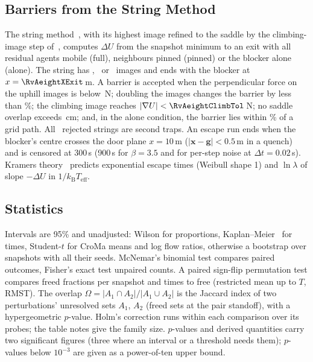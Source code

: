 \subsection{Barriers from the String Method}\label{sec:barrier}
The string method~\cite{e2007}, with its highest image refined to the saddle by the climbing-image step of~\cite{henkelman2000}, computes $\Delta U$ from the snapshot minimum to an exit with all residual agents mobile (full), neighbours pinned (pinned) or the blocker alone (alone). The string has \RvAeightImgLo, \RvAeightImgMid\ or \RvAeightImgHi\ images and ends with the blocker at $x=\RvAeightXExit$\,m. A barrier is accepted when the perpendicular force on the uphill images is below \RvAeightFTol\,N; doubling the images changes the barrier by less than \RvAeightDoubleTol\%; the climbing image reaches $|\nabla U|<\RvAeightClimbTol$\,N; no saddle overlap exceeds \RvAeightOverlap\,cm; and, in the alone condition, the barrier lies within \RvAeightGridTol\% of a grid path. All \RvAeightFailed\ rejected strings are second traps. An escape run ends when the blocker's centre crosses the door plane $x=10$\,m ($|\mathbf{x}-\mathbf{g}|<0.5$\,m in a quench) and is censored at 300\,s (900\,s for $\beta=3.5$ and for per-step noise at $\Delta t=0.02$\,s). Kramers theory~\cite{kramers1940,langer1969,hanggi1990} predicts exponential escape times (Weibull shape 1) and $\ln\lambda$ of slope $-\Delta U$ in $1/k_{\mathrm{B}}T_{\mathrm{eff}}$.

\subsection{Statistics}\label{sec:stats}
Intervals are 95\% and unadjusted: Wilson for proportions, Kaplan--Meier~\cite{kaplanmeier1958} for times, Student-$t$ for CroMa means and log flow ratios, otherwise a bootstrap over snapshots with all their seeds. McNemar's binomial test compares paired outcomes, Fisher's exact test unpaired counts. A paired sign-flip permutation test compares freed fractions per snapshot and times to free (restricted mean up to $T$, RMST). The overlap $\Omega=|A_1\cap A_2|/|A_1\cup A_2|$ is the Jaccard index of two perturbations' unresolved sets $A_1$, $A_2$ (freed sets at the pair standoff), with a hypergeometric $p$-value. Holm's correction runs within each comparison over its probes; the table notes give the family size. $p$-values and derived quantities carry two significant figures (three where an interval or a threshold needs them); $p$-values below $10^{-3}$ are given as a power-of-ten upper bound.

